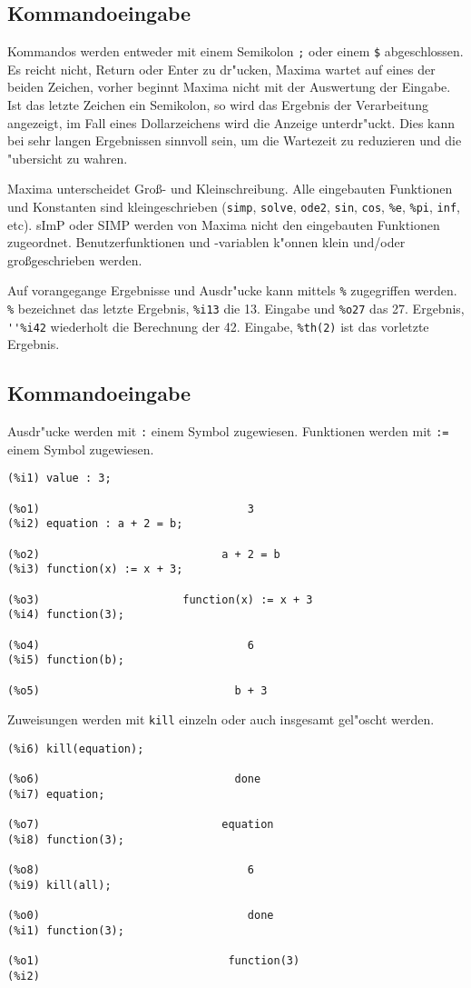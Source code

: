 \documentclass[spanish,12pt,a4paper]{article}
\begin{document}
\subsection{Kommandoeingabe}

Kommandos werden entweder mit einem Semikolon  \verb|;|  oder einem  \verb|$| abgeschlossen. Es reicht nicht, Return oder Enter zu dr"ucken, Maxima wartet auf eines der beiden Zeichen, vorher beginnt Maxima nicht mit der Auswertung der Eingabe. Ist das letzte Zeichen ein Semikolon, so wird das Ergebnis der Verarbeitung angezeigt, im Fall eines Dollarzeichens wird die Anzeige unterdr"uckt. Dies kann bei sehr langen Ergebnissen sinnvoll sein, um die Wartezeit zu reduzieren und die "ubersicht zu wahren.

Maxima unterscheidet Gro{\ss}- und Kleinschreibung. Alle eingebauten Funktionen und Konstanten sind kleingeschrieben (\verb|simp|, \verb|solve|, \verb|ode2|, \verb|sin|, \verb|cos|, \verb|%e|, \verb|%pi|, \verb|inf|, etc). sImP oder SIMP werden von Maxima nicht den eingebauten Funktionen zugeordnet. Benutzerfunktionen und -variablen k"onnen klein und/oder gro{\ss}geschrieben werden.

Auf vorangegange Ergebnisse und Ausdr"ucke kann mittels \verb|%| zugegriffen werden. \verb|%| bezeichnet das letzte Ergebnis, \verb|%i13| die 13. Eingabe und \verb|%o27| das 27. Ergebnis, \verb|''%i42| wiederholt die Berechnung der 42. Eingabe, \verb|%th(2)| ist das vorletzte Ergebnis.

\subsection{Kommandoeingabe}

Ausdr"ucke werden mit \verb|:| einem Symbol zugewiesen. Funktionen werden mit \verb|:=| einem Symbol zugewiesen.

\scriptsize
\begin{verbatim}
(%i1) value : 3;

(%o1)                                3
(%i2) equation : a + 2 = b;

(%o2)                            a + 2 = b
(%i3) function(x) := x + 3;

(%o3)                      function(x) := x + 3
(%i4) function(3);

(%o4)                                6
(%i5) function(b);

(%o5)                              b + 3
\end{verbatim}
\normalsize
Zuweisungen werden mit \verb|kill| einzeln oder auch insgesamt gel"oscht werden.
\scriptsize
\begin{verbatim}
(%i6) kill(equation);

(%o6)                              done
(%i7) equation;

(%o7)                            equation
(%i8) function(3);

(%o8)                                6
(%i9) kill(all);

(%o0)                                done
(%i1) function(3);

(%o1)                             function(3)
(%i2) 
\end{verbatim}
\normalsize
\end{document}
